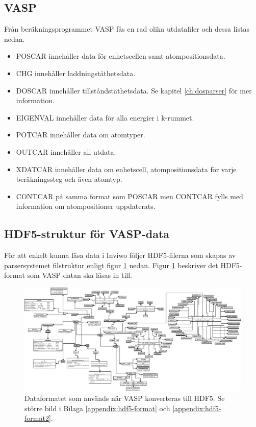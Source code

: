 \documentclass[a4paper,12pt]{article}
\begin{document}
\subsection{VASP}
Från beräkningsprogrammet VASP fås en rad olika utdatafiler och dessa listas nedan.  

\begin{itemize}
	\item{POSCAR} innehåller data för enhetscellen samt atompositionsdata.
    \item{CHG} innehåller laddningstäthetsdata.
    \item{DOSCAR} innehåller tillståndstäthetsdata. Se kapitel \ref{ch:dosparser} för mer information.
    \item{EIGENVAL} innehåller data för alla energier i k-rummet.
    \item{POTCAR} innehåller data om atomtyper.
    \item{OUTCAR} innehåller all utdata.
    \item{XDATCAR} innehåller data om enhetscell, atompositionsdata för varje beräkningssteg och även atomtyp.
    \item{CONTCAR} på samma format som POSCAR men CONTCAR fylls med information om atompositioner uppdaterats.
\end{itemize}

\subsection{HDF5-struktur för VASP-data}
\label{ch:hdf5struktur}
För att enkelt kunna läsa data i Inviwo följer HDF5-filerna som skapas av parsersystemet filstruktur enligt figur \ref{fig:hdf5-dataformat3} nedan. Figur \ref{fig:hdf5-dataformat3}
beskriver det HDF5-format som VASP-datan
ska läsas in till.

\begin{figure}[H]
    \centering
    \includegraphics[scale=0.16]{hdf5-dataformat3tekdok.png}
    \caption{Dataformatet som används när VASP konverteras till HDF5.
    Se större bild i Bilaga \ref{appendix:hdf5-format} och \ref{appendix:hdf5-format2}.}
    \label{fig:hdf5-dataformat3}
\end{figure}
\end{document}
